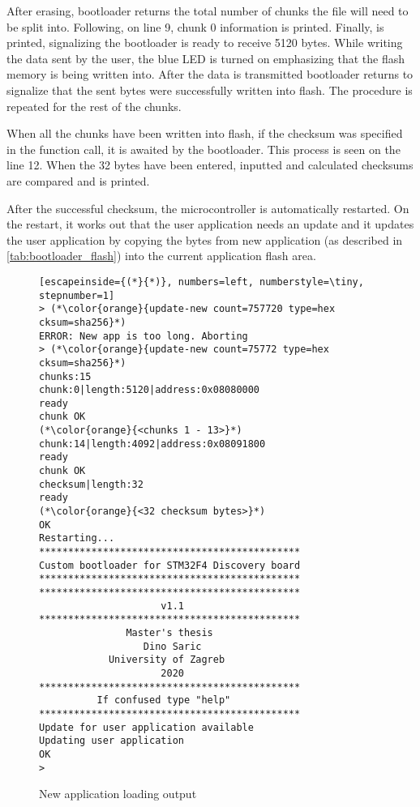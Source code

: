 After erasing, bootloader returns the total number of chunks the file will need to be split into. Following, on line 9, chunk 0 information is printed. Finally,  is printed, signalizing the bootloader is ready to receive 5120 bytes. While writing the data sent by the user, the blue LED is turned on emphasizing that the flash memory is being written into. After the data is transmitted bootloader returns  to signalize that the sent bytes were successfully written into flash. The procedure is repeated for the rest of the chunks.  

When all the chunks have been written  into flash, if the checksum was specified in the function call,  it is awaited by the bootloader. This process is seen on the line 12. When the 32 bytes have been entered, inputted and calculated checksums are compared and  is printed.

After the successful checksum, the microcontroller is automatically restarted. On the restart, it works out that the user application needs an update and it updates the user application by copying the bytes from new application (as described in \autoref{tab:bootloader_flash}) into the current application flash area.

\begin{figure}[H]
\begin{changemargin}{1cm}{1cm}
\begin{lstlisting}[escapeinside={(*}{*)}, numbers=left, numberstyle=\tiny, stepnumber=1]
> (*\color{orange}{update-new count=757720 type=hex cksum=sha256}*)
ERROR: New app is too long. Aborting
> (*\color{orange}{update-new count=75772 type=hex cksum=sha256}*)
chunks:15
chunk:0|length:5120|address:0x08080000
ready
chunk OK
(*\color{orange}{<chunks 1 - 13>}*)
chunk:14|length:4092|address:0x08091800
ready
chunk OK
checksum|length:32
ready
(*\color{orange}{<32 checksum bytes>}*)
OK
Restarting...
*********************************************
Custom bootloader for STM32F4 Discovery board
*********************************************
*********************************************
                     v1.1
*********************************************
               Master's thesis
                  Dino Saric
            University of Zagreb
                     2020
*********************************************
          If confused type "help"          
*********************************************
Update for user application available
Updating user application
OK
> 
\end{lstlisting}  
\end{changemargin}
\caption{New application loading output}
\label{fig:new_application_loading}
\end{figure}

